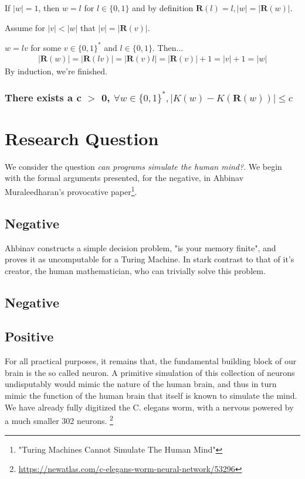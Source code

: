 \documentclass{article}
\begin{document}
If $|w| = 1$, then $w = l$ for $l\in \{0,1\}$ and by definition $\bm{R}(l) = l, |w|=|\bm{R}(w)|$.

Assume for $|v| < |w|$ that $|v| = |\bm{R}(v)|$.

$w = lv$ for some $v \in \{0,1\}^*$ and $l \in \{0,1\}$. Then...
\begin{align*}
	|\bm{R}(w)| = |\bm{R}(lv)| = |\bm{R}(v)l| = |\bm{R}(v)|+1 = |v|+1 = |w|
\end{align*}
By induction, we're finished.

\subsubsection*{There exists a c $>$ 0, $\forall w \in \{0,1\}^*, |K(w) - K(\bm{R}(w))| \leq c$}

\section*{Research Question}
We consider the question \emph{can programs simulate the human mind?}. We begin with the formal arguments presented, for the negative, in Ahbinav Muraleedharan's provocative paper\footnote{"Turing Machines Cannot Simulate The Human Mind"}.

\subsection*{Negative}
Ahbinav constructs a simple decision problem, "is your memory finite", and proves it as uncomputable for a Turing Machine. In stark contrast to that of it's creator, the human mathematician, who can trivially solve this problem.

\subsection*{Negative}

\subsection*{Positive}
For all practical purposes, it remains that, the fundamental building block of our brain is the so called neuron. A primitive simulation of this collection of neurons undisputably would mimic the nature of the human brain, and thus in turn mimic the function of the human brain that itself is known to simulate the mind. We have already fully digitized the C. elegans worm, with a nervous powered by a much smaller 302 neurons. \footnote{\url{https://newatlas.com/c-elegans-worm-neural-network/53296}}
\end{document}
